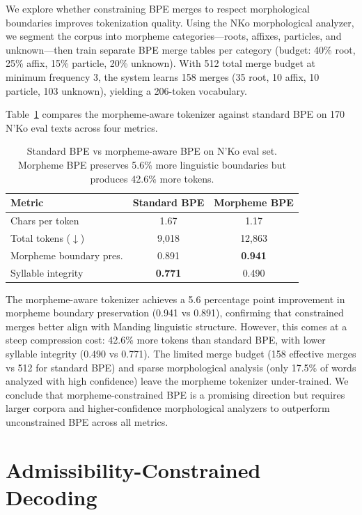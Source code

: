 \documentclass[11pt]{article}
\begin{document}
We explore whether constraining BPE merges to respect morphological boundaries improves tokenization quality.
Using the NKo morphological analyzer, we segment the corpus into morpheme categories---roots, affixes, particles, and unknown---then train separate BPE merge tables per category (budget: 40\% root, 25\% affix, 15\% particle, 20\% unknown).
With 512 total merge budget at minimum frequency 3, the system learns 158 merges (35 root, 10 affix, 10 particle, 103 unknown), yielding a 206-token vocabulary.

Table~\ref{tab:morpheme-bpe} compares the morpheme-aware tokenizer against standard BPE on 170 N'Ko eval texts across four metrics.

\begin{table}[t]
\centering
\small
\begin{tabular}{lcc}
\toprule
\textbf{Metric} & \textbf{Standard BPE} & \textbf{Morpheme BPE} \\
\midrule
Chars per token & 1.67 & 1.17 \\
Total tokens ($\downarrow$) & 9,018 & 12,863 \\
Morpheme boundary pres. & 0.891 & \textbf{0.941} \\
Syllable integrity & \textbf{0.771} & 0.490 \\
\bottomrule
\end{tabular}
\caption{Standard BPE vs morpheme-aware BPE on N'Ko eval set. Morpheme BPE preserves 5.6\% more linguistic boundaries but produces 42.6\% more tokens.}
\label{tab:morpheme-bpe}
\end{table}

The morpheme-aware tokenizer achieves a 5.6 percentage point improvement in morpheme boundary preservation (0.941 vs 0.891), confirming that constrained merges better align with Manding linguistic structure.
However, this comes at a steep compression cost: 42.6\% more tokens than standard BPE, with lower syllable integrity (0.490 vs 0.771).
The limited merge budget (158 effective merges vs 512 for standard BPE) and sparse morphological analysis (only 17.5\% of words analyzed with high confidence) leave the morpheme tokenizer under-trained.
We conclude that morpheme-constrained BPE is a promising direction but requires larger corpora and higher-confidence morphological analyzers to outperform unconstrained BPE across all metrics.

\section{Admissibility-Constrained Decoding}
\label{sec:admissibility}
\end{document}
